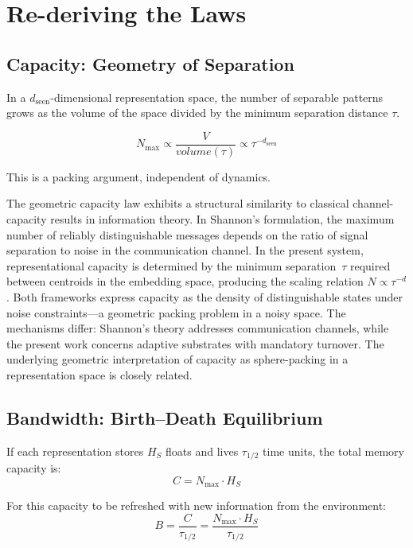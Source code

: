 \documentclass[11pt]{article}
\begin{document}
\section{Re-deriving the Laws}

\subsection{Capacity: Geometry of Separation}

In a $d_{\text{seen}}$-dimensional representation space, the number of separable patterns grows as the volume of the space divided by the minimum separation distance $\tau$.

\begin{equation}
N_{\max} \propto \frac{V}{volume(\tau)} \propto \tau^{-d_{\text{seen}}}
\end{equation}

This is a packing argument, independent of dynamics.

The geometric capacity law exhibits a structural similarity to classical channel-capacity results in information theory.
In Shannon's formulation, the maximum number of reliably distinguishable messages depends on the ratio of signal separation to noise in the communication channel.
In the present system, representational capacity is determined by the minimum separation~$\tau$ required between centroids in the embedding space, producing the scaling relation $N \propto \tau^{-d}$.
Both frameworks express capacity as the density of distinguishable states under noise constraints---a geometric packing problem in a noisy space.
The mechanisms differ: Shannon's theory addresses communication channels, while the present work concerns adaptive substrates with mandatory turnover.
The underlying geometric interpretation of capacity as sphere-packing in a representation space is closely related.

\subsection{Bandwidth: Birth--Death Equilibrium}

If each representation stores $H_S$ floats and lives $\tau_{1/2}$ time units, the total memory capacity is:
\begin{equation}
C = N_{\max} \cdot H_S
\end{equation}

For this capacity to be refreshed with new information from the environment:
\begin{equation}
B = \frac{C}{\tau_{1/2}} = \frac{N_{\max} \cdot H_S}{\tau_{1/2}}
\end{equation}
\end{document}
